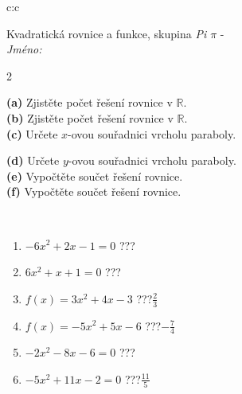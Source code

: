 \documentclass[10pt]{report}
\begin{document}
\begin{tabular}{c:c}
\begin{minipage}[c][104.5mm][t]{0.5\linewidth}
\begin{center}
\vspace{7mm}
{\huge \LARGE Kvadratická rovnice a funkce, skupina \textit{Pi $\pi$} -}\\[5mm]
\textit{Jméno:}\phantom{xxxxxxxxxxxxxxxxxxxxxxxxxxxxxxxxxxxxxxxxxxxxxxxxxxxxxxxxxxxxxxxxx}\\[5mm]
\begin{minipage}{0.95\linewidth}
\begin{center}
{\small \begin{multicols}{2} \raggedright
\textbf{(a)} Zjistěte počet řešení rovnice v \(\mathbb{R}\). \\[1mm]
\textbf{(b)} Zjistěte počet řešení rovnice v \(\mathbb{R}\). \\[1mm]
\textbf{(c)} Určete \(x\)-ovou souřadnici vrcholu paraboly. \par \columnbreak
\textbf{(d)} Určete \(y\)-ovou souřadnici vrcholu paraboly. \\[1mm]
\textbf{(e)} Vypočtěte součet řešení rovnice. \\[1mm]
\textbf{(f)} Vypočtěte součet řešení rovnice.
\end{multicols}
}
\end{center}
\end{minipage}
\\[4mm]
\begin{minipage}{0.79\linewidth}
\begin{center}
\begin{varwidth}{\linewidth}
\begin{enumerate}
\Large
\item $-6x^2+2x-1=0$\quad \dotfill\; ???\;\dotfill {}
\item $6x^2+x+1=0$\quad \dotfill\; ???\;\dotfill {}
\item $f(x)=3x^2+4x-3$\quad \dotfill\; ???\;\dotfill \quad $\frac{2}{3}$
\item $f(x)=-5x^2+5x-6$\quad \dotfill\; ???\;\dotfill \quad $-\frac{7}{4}$
\item $-2x^2-8x-6=0$\quad \dotfill\; ???\;\dotfill {}
\item $-5x^2+11x-2=0$\quad \dotfill\; ???\;\dotfill \quad $\frac{11}{5}$
\end{enumerate}
\end{varwidth}
\end{center}
\end{minipage}

\end{center}
\end{minipage}
\end{tabular}
\end{document}
